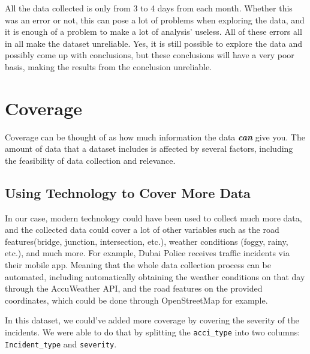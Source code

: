 \documentclass[
]{book}
\newenvironment{Shaded}{\begin{snugshade}}{\end{snugshade}}
\newcommand{\DataTypeTok}[1]{\textcolor[rgb]{0.13,0.29,0.53}{#1}}
\newcommand{\KeywordTok}[1]{\textcolor[rgb]{0.13,0.29,0.53}{\textbf{#1}}}
\newcommand{\NormalTok}[1]{#1}
\newcommand{\OperatorTok}[1]{\textcolor[rgb]{0.81,0.36,0.00}{\textbf{#1}}}
\newcommand{\StringTok}[1]{\textcolor[rgb]{0.31,0.60,0.02}{#1}}
\begin{document}
All the data collected is only from 3 to 4 days from each month. Whether this was an error or not, this can pose a lot of problems when exploring the data, and it is enough of a problem to make a lot of analysis' useless. All of these errors all in all make the dataset unreliable. Yes, it is still possible to explore the data and possibly come up with conclusions, but these conclusions will have a very poor basis, making the results from the conclusion unreliable.

\hypertarget{coverage}{%
\section{Coverage}\label{coverage}}

Coverage can be thought of as how much information the data \textbf{\emph{can}} give you. The amount of data that a dataset includes is affected by several factors, including the feasibility of data collection and relevance.

\hypertarget{using-technology-to-cover-more-data}{%
\subsection{Using Technology to Cover More Data}\label{using-technology-to-cover-more-data}}

In our case, modern technology could have been used to collect much more data, and the collected data could cover a lot of other variables such as the road features(bridge, junction, intersection, etc.), weather conditions (foggy, rainy, etc.), and much more. For example, Dubai Police receives traffic incidents via their mobile app. Meaning that the whole data collection process can be automated, including automatically obtaining the weather conditions on that day through the AccuWeather API, and the road features on the provided coordinates, which could be done through OpenStreetMap for example.

In this dataset, we could've added more coverage by covering the severity of the incidents. We were able to do that by splitting the \texttt{acci\_type} into two columns: \texttt{Incident\_type} and \texttt{severity}.

\begin{Shaded}
\end{Shaded}
\end{document}

